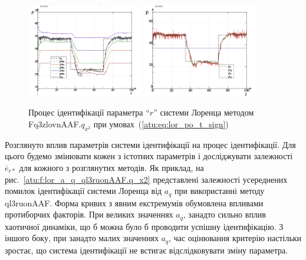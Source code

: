 \documentclass[a4paper,13pt]{atuaref}
\begin{document}
\begin{figure}[ht!]
  \centerline{
    \includegraphics[width=0.45\textwidth]{p5/p/cha/lor/Fq3zlovnAAF/lor_Fq3zlovnAAF_qx2-pl_n_sign_xl.png}
    \hfill
    \includegraphics[width=0.45\textwidth]{p5/p/cha/lor/Fq3zlovnAAF/lor_Fq3zlovnAAF_qx2-p_p_sign_xl.png}
  }
  \caption{Процес ідентифікації параметра ``$r$'' системи Лоренца методом Fq3zlovnAAF.$q_{x^2}$ при умовах~(\ref{atu:eq:lor_po_t_sign})}
  \label{atu:f:lor_id_Fq3zlovnAAF.q_x2_sign}
\end{figure}


Розглянуто вплив параметрів системи ідентифікації на процес ідентифікації. Для
цього будемо змінювати кожен з істотних параметрів і досліджувати
залежності $\overline {e}_{r*} $ для кожного з розглянутих методів.
Як приклад,
на рис.~\ref{atu:f:lor_a_q_ql3ruonAAF.q_x2} представлені залежності
усереднених помилок ідентифікації системи Лоренца від $ a_q $ при використанні
методу ql3ruonAAF.
Форма кривих з явним екстремумів обумовлена впливами протиборчих
факторів. При великих значеннях $ a_q $, занадто сильно вплив хаотичної
динаміки, що б можна було б проводити успішну ідентифікацію. З іншого боку, при
занадто малих значеннях $ a_q $, час оцінювання критерію настільки зростає, що
система ідентифікації не встигає відслідковувати зміну параметра.
\end{document}
